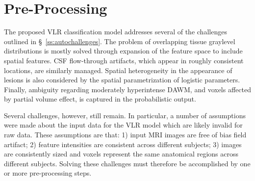 \section{Pre-Processing}\label{s:meth-pre}
The proposed VLR classification model addresses several of the challenges outlined in \S\ \ref{ss:autochallenges}.
The problem of overlapping tissue graylevel distributions is mostly solved through expansion of the feature space to include spatial features.
CSF flow-through artifacts, which appear in roughly consistent locations, are similarly managed.
Spatial heterogeneity in the appearance of lesions is also considered by the spatial parametrization of logistic parameters.
Finally, ambiguity regarding moderately hyperintense DAWM, and voxels affected by partial volume effect, is captured in the probabilistic output.
\par
Several challenges, however, still remain.
In particular, a number of assumptions were made about the input data for the VLR model which are likely invalid for raw data.
These assumptions are that:
1) input MRI images are free of bias field artifact;
2) feature intensities are consistent across different subjects;
3) images are consistently sized and voxels represent the same anatomical regions across different subjects.
Solving these challenges must therefore be accomplished by one or more pre-processing steps.
